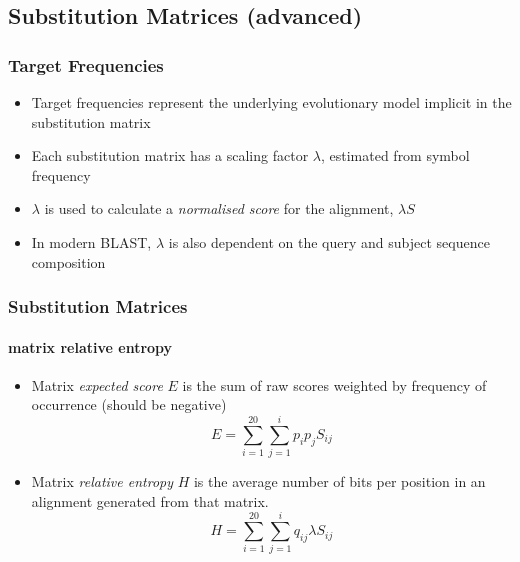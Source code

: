 
\subsection{Substitution Matrices (advanced)}
\begin{frame}
  \frametitle{Target Frequencies}
  \begin{itemize}
    \item Target frequencies represent the underlying evolutionary model implicit in the substitution matrix
    \item Each substitution matrix has a scaling factor $\lambda$, estimated from symbol frequency
    \item $\lambda$ is used to calculate a \emph{normalised score} for the alignment, $\lambda S$
    \item In modern BLAST, $\lambda$ is also dependent on the query and subject sequence composition
  \end{itemize}
\end{frame}   

\begin{frame}
  \frametitle{Substitution Matrices}
  \framesubtitle{matrix relative entropy}
  \begin{itemize}
    \item Matrix \emph{expected score} $E$ is the sum of raw scores weighted by frequency of occurrence (should be negative)
    \begin{equation}
      E = \sum^{20}_{i=1}\sum_{j=1}^{i} p_i p_j S_{ij}
    \end{equation}
    \item Matrix \emph{relative entropy} $H$ is the average number of bits per position in an alignment generated from that matrix.
    \begin{equation}
      H = \sum^{20}_{i=1}\sum_{j=1}^{i} q_{ij} \lambda S_{ij}
    \end{equation}
  \end{itemize}
\end{frame} 